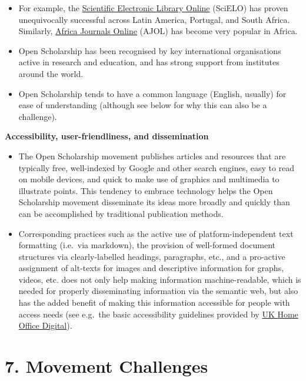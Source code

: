\begin{itemize}
\item
  For example, the
  \href{http://www.scielo.org/php/index.php?lang=en}{Scientific
  Electronic Library Online} (SciELO) has proven unequivocally
  successful across Latin America, Portugal, and South Africa.
  Similarly, \href{https://www.ajol.info/}{Africa Journals Online}
  (AJOL) has become very popular in Africa.
\item
  Open Scholarship has been recognised by key international
  organisations active in research and education, and has strong support
  from institutes around the world.
\item
  Open Scholarship tends to have a common language (English, usually)
  for ease of understanding (although see below for why this can also be
  a challenge).
\end{itemize}

\textbf{Accessibility, user-friendliness, and dissemination}

\begin{itemize}
\item
  The Open Scholarship movement publishes articles and resources that
  are typically free, well-indexed by Google and other search engines,
  easy to read on mobile devices, and quick to make use of graphics and
  multimedia to illustrate points. This tendency to embrace technology
  helps the Open Scholarship movement disseminate its ideas more broadly
  and quickly than can be accomplished by traditional publication
  methods.
\item
  Corresponding practices such as the active use of platform-independent
  text formatting (i.e.~via markdown), the provision of well-formed
  document structures via clearly-labelled headings, paragraphs, etc.,
  and a pro-active assignment of alt-texts for images and descriptive
  information for graphs, videos, etc. does not only help making
  information machine-readable, which is needed for properly
  disseminating information via the semantic web, but also has the added
  benefit of making this information accessible for people with access
  needs (see e.g.~the basic accessibility guidelines provided by
  \href{https://github.com/UKHomeOffice/posters/blob/master/accessibility/dos-donts/posters_en-UK/accessibility-posters-set.pdf}{UK
  Home Office Digital}).
\end{itemize}

\section{7. Movement Challenges }\label{movement-challenges}


